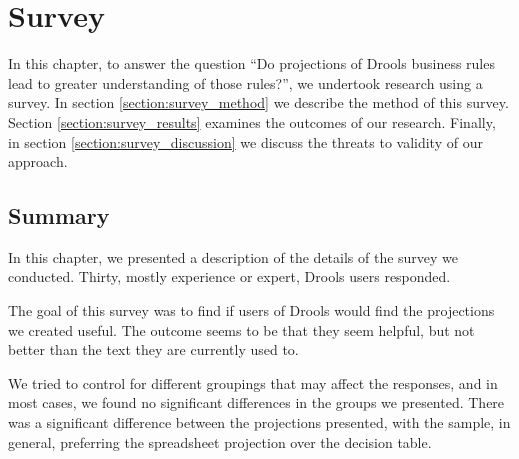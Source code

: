 \chapter{Survey}
\label{chapter:Survey}

In this chapter, to answer the question ``Do projections of Drools business rules lead to greater understanding of those rules?'', we undertook research using a survey.
In section \ref{section:survey_method} we describe the method of this survey.
Section \ref{section:survey_results} examines the outcomes of our research.
Finally, in section \ref{section:survey_discussion} we discuss the threats to validity of our approach.





\section{Summary}
In this chapter, we presented a description of the details of the survey we conducted.
Thirty, mostly experience or expert, Drools users responded. 

The goal of this survey was to find if users of Drools would find the projections we created useful.
The outcome seems to be that they seem helpful, but not better than the text they are currently used to.

We tried to control for different groupings that may affect the responses, and in most cases, we found no significant differences in the groups we presented.
There was a significant difference between the projections presented, with the sample, in general, preferring the spreadsheet projection over the decision table. 
